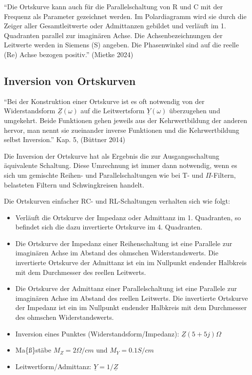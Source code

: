 \documentclass[
  ngerman,
  letterpaper,
]{scrbook}
\begin{document}
``Die Ortskurve kann auch für die Parallelschaltung von R und C mit der
Frequenz als Parameter gezeichnet werden. Im Polardiagramm wird sie
durch die Zeiger aller Gesamtleitwerte oder Admittanzen gebildet und
verläuft im 1. Quadranten parallel zur imaginären Achse. Die
Achsenbezeichnungen der Leitwerte werden in Siemens (S) angeben. Die
Phasenwinkel sind auf die reelle (Re) Achse bezogen positiv.'' (Mietke
2024)

\subsection{Inversion von Ortskurven}\label{inversion-von-ortskurven}

``Bei der Konstruktion einer Ortskurve ist es oft notwendig von der
Widerstandsform \(\underline{Z}(\omega)\) auf die Leitwertsform
\(\underline{Y}(\omega)\) überzugehen und umgekehrt. Beide Funktionen
gehen jeweils aus der Kehrwertbildung der anderen hervor, man nennt sie
zueinander inverse Funktionen und die Kehrwertbildung selbst
Inversion.'' Kap. 5, (Büttner 2014)

Die Inversion der Ortskurve hat als Ergebnis die zur Ausgangsschaltung
äquivalente Schaltung. Diese Umrechnung ist immer dann notwendig, wenn
es sich um gemischte Reihen- und Parallelschaltungen wie bei T- und
\(\Pi\)-Filtern, belasteten Filtern und Schwingkreisen handelt.

Die Ortskurven einfacher RC- und RL-Schaltungen verhalten sich wie
folgt:

\begin{itemize}
\item
  Verläuft die Ortskurve der Impedanz oder Admittanz im 1. Quadranten,
  so befindet sich die dazu invertierte Ortskurve im 4. Quadranten.
\item
  Die Ortskurve der Impedanz einer Reihenschaltung ist eine Parallele
  zur imaginären Achse im Abstand des ohmschen Widerstandswerts. Die
  invertierte Ortskurve der Admittanz ist ein im Nullpunkt endender
  Halbkreis mit dem Durchmesser des reellen Leitwerts.
\item
  Die Ortskurve der Admittanz einer Parallelschaltung ist eine Parallele
  zur imaginären Achse im Abstand des reellen Leitwerts. Die invertierte
  Ortskurve der Impedanz ist ein im Nullpunkt endender Halbkreis mit dem
  Durchmesser des ohmschen Widerstandswerts.
\item
  Inversion eines Punktes (Widerstandsform/Impedanz):
  \(\underline{Z} (5 + 5j) \Omega\)
\item
  Ma\{\ss\}stäbe \(M_Z = 2 \Omega/cm\) und \(M_Y = 0.1 S/cm\)
\item
  Leitwertform/Admittanz: \(\underline{Y} = 1 / \underline{Z}\)
\end{itemize}
\end{document}
